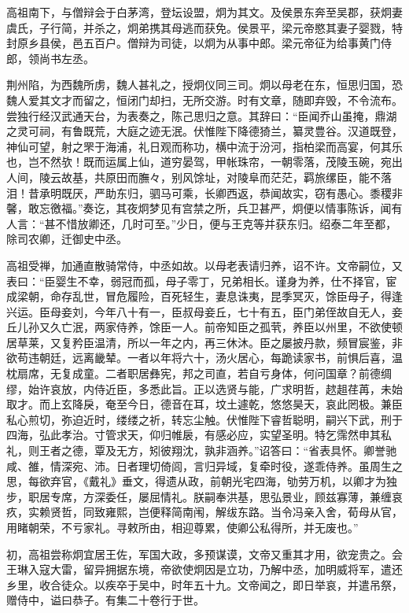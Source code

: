 \documentclass[]{article}
\begin{document}
高祖南下，与僧辩会于白茅湾，登坛设盟，炯为其文。及侯景东奔至吴郡，获炯妻虞氏，子行简，并杀之，炯弟携其母逃而获免。侯景平，梁元帝愍其妻子婴戮，特封原乡县侯，邑五百户。僧辩为司徒，以炯为从事中郎。梁元帝征为给事黄门侍郎，领尚书左丞。

荆州陷，为西魏所虏，魏人甚礼之，授炯仪同三司。炯以母老在东，恒思归国，恐魏人爱其文才而留之，恒闭门却扫，无所交游。时有文章，随即弃毁，不令流布。尝独行经汉武通天台，为表奏之，陈己思归之意。其辞曰：``臣闻乔山虽掩，鼎湖之灵可祠，有鲁既荒，大庭之迹无泯。伏惟陛下降德猗兰，纂灵豊谷。汉道既登，神仙可望，射之罘于海浦，礼日观而称功，横中流于汾河，指柏梁而高宴，何其乐也，岂不然欤！既而运属上仙，道穷晏驾，甲帐珠帘，一朝零落，茂陵玉碗，宛出人间，陵云故基，共原田而膴々，别风馀址，对陵阜而茫茫，羁旅缧臣，能不落泪！昔承明既厌，严助东归，驷马可乘，长卿西返，恭闻故实，窃有愚心。黍稷非馨，敢忘徼福。''奏讫，其夜炯梦见有宫禁之所，兵卫甚严，炯便以情事陈诉，闻有人言：``甚不惜放卿还，几时可至。''少日，便与王克等并获东归。绍泰二年至都，除司农卿，迁御史中丞。

高祖受禅，加通直散骑常侍，中丞如故。以母老表请归养，诏不许。文帝嗣位，又表曰：``臣婴生不幸，弱冠而孤，母子零丁，兄弟相长。谨身为养，仕不择官，宦成梁朝，命存乱世，冒危履险，百死轻生，妻息诛夷，昆季冥灭，馀臣母子，得逢兴运。臣母妾刘，今年八十有一，臣叔母妾丘，七十有五，臣门弟侄故自无人，妾丘儿孙又久亡泯，两家侍养，馀臣一人。前帝知臣之孤茕，养臣以州里，不欲使顿居草莱，又复矜臣温清，所以一年之内，再三休沐。臣之屡披丹款，频冒宸鉴，非欲苟违朝廷，远离畿辇。一者以年将六十，汤火居心，每跪读家书，前惧后喜，温枕扇席，无复成童。二者职居彝宪，邦之司直，若自亏身体，何问国章？前德绸缪，始许哀放，内侍近臣，多悉此旨。正以选贤与能，广求明哲，趑趄荏苒，未始取才。而上玄降戾，奄至今日，德音在耳，坟土遽乾，悠悠昊天，哀此罔极。兼臣私心煎切，弥迫近时，缕缕之祈，转忘尘触。伏惟陛下睿哲聪明，嗣兴下武，刑于四海，弘此孝治。寸管求天，仰归帷扆，有感必应，实望圣明。特乞霈然申其私礼，则王者之德，覃及无方，矧彼翔沈，孰非涵养。''诏答曰：``省表具怀。卿誉驰咸、雒，情深宛、沛。日者理切倚闾，言归异域，复牵时役，遂乖侍养。虽周生之思，每欲弃官，《戴礼》垂文，得遗从政，前朝光宅四海，劬劳万机，以卿才为独步，职居专席，方深委任，屡屈情礼。朕嗣奉洪基，思弘景业，顾兹寡薄，兼缠哀疚，实赖贤哲，同致雍熙，岂便释简南闱，解绂东路。当令冯亲入舍，荀母从官，用睹朝荣，不亏家礼。寻敕所由，相迎尊累，使卿公私得所，并无废也。''

初，高祖尝称炯宜居王佐，军国大政，多预谋谟，文帝又重其才用，欲宠贵之。会王琳入寇大雷，留异拥据东境，帝欲使炯因是立功，乃解中丞，加明威将军，遣还乡里，收合徒众。以疾卒于吴中，时年五十九。文帝闻之，即日举哀，并遣吊祭，赠侍中，谥曰恭子。有集二十卷行于世。
\end{document}
